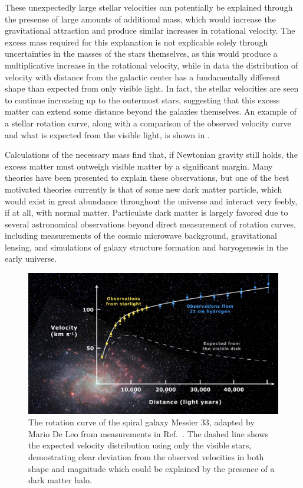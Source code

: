 These unexpectedly large stellar velocities can potentially be explained through the presense of large amounts of additional mass, which would increase the gravitational attraction and produce similar increases in rotational velocity. 
The excess mass required for this explanation is not explicable solely through uncertainties in the masses of the stars themselves, as this would produce a multiplicative increase in the rotational velocity, while in data the distribution of velocity with distance from the galactic center has a fundamentally different shape than expected from only visible light.
In fact, the stellar velocities are seen to continue increasing up to the outermost stars, suggesting that this excess matter can extend some distance beyond the galaxies themselves. 
An example of a stellar rotation curve, along with a comparison of the observed velocity curve and what is expected from the visible light, is shown in .

Calculations of the necessary mass find that, if Newtonian gravity still holds, the excess matter must outweigh visible matter by a significant margin. 
Many theories have been presented to explain these observations, but one of the best motivated theories currently is that of some new dark matter particle, which would exist in great abundance throughout the universe and interact very feebly, if at all, with normal matter.
Particulate dark matter is largely favored due to several astronomical observations beyond direct measurement of rotation curves, including measurements of the cosmic microwave background, gravitational lensing, and simulations of galaxy structure formation and baryogenesis in the early universe.

\begin{figure}
   \centering
   \includegraphics[width=\textwidth]{figures/rotation_curve.png}
   \caption[Rotation curve of Messier 33]{The rotation curve of the spiral galaxy Messier 33, adapted by Mario De Leo from measurements in Ref.~\cite{Corbelli}. The dashed line shows the expected velocity distribution using only the visible stars, demostrating clear deviation from the observed velocities in both shape and magnitude which could be explained by the presence of a dark matter halo.}
   \label{fig:rotCurve}	
\end{figure}

